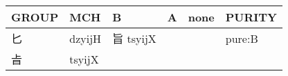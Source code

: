 \documentclass[14pt,a4paper]{scrartcl}
\begin{document}
\begin{longtable}[c]{@{}llllll@{}}
\toprule
\begin{minipage}[b]{0.14\columnwidth}\raggedright\strut
GROUP
\strut\end{minipage} &
\begin{minipage}[b]{0.14\columnwidth}\raggedright\strut
MCH
\strut\end{minipage} &
\begin{minipage}[b]{0.14\columnwidth}\raggedright\strut
B
\strut\end{minipage} &
\begin{minipage}[b]{0.14\columnwidth}\raggedright\strut
A
\strut\end{minipage} &
\begin{minipage}[b]{0.14\columnwidth}\raggedright\strut
none
\strut\end{minipage} &
\begin{minipage}[b]{0.14\columnwidth}\raggedright\strut
PURITY
\strut\end{minipage}\tabularnewline
\midrule
\endhead
\begin{minipage}[t]{0.14\columnwidth}\raggedright\strut
匕
\strut\end{minipage} &
\begin{minipage}[t]{0.14\columnwidth}\raggedright\strut
dzyijH
\strut\end{minipage} &
\begin{minipage}[t]{0.14\columnwidth}\raggedright\strut
旨 tsyijX
\strut\end{minipage} &
\begin{minipage}[t]{0.14\columnwidth}\raggedright\strut
\strut\end{minipage} &
\begin{minipage}[t]{0.14\columnwidth}\raggedright\strut
\strut\end{minipage} &
\begin{minipage}[t]{0.14\columnwidth}\raggedright\strut
pure:B
\strut\end{minipage}\tabularnewline
\begin{minipage}[t]{0.14\columnwidth}\raggedright\strut
㫖
\strut\end{minipage} &
\begin{minipage}[t]{0.14\columnwidth}\raggedright\strut
tsyijX
\strut\end{minipage} &
\begin{minipage}[t]{0.14\columnwidth}\raggedright\strut
\strut\end{minipage} &
\begin{minipage}[t]{0.14\columnwidth}\raggedright\strut

\end{minipage}
\end{longtable}
\end{document}

